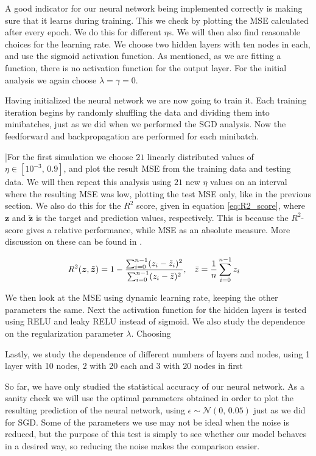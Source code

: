 \documentclass[12pt]{extarticle}
\begin{document}
A good indicator for our neural network being implemented correctly is making sure that it learns during training. This we check by plotting the MSE calculated after every epoch. We do this for different $\eta$s. We will then also find reasonable choices for the learning rate. We choose two hidden layers with ten nodes in each, and use the sigmoid activation function. As mentioned, as we are fitting a function, there is no activation function for the output layer. For the initial analysis we again choose $\lambda=\gamma=0$.

Having initialized the neural network we are now going to train it. Each training iteration begins by randomly shuffling the data and dividing them into minibatches, just as we did when we performed the SGD analysis. Now the feedforward and backpropagation are performed for each minibatch.

|For the first simulation we choose $21$ linearly distributed values of $\eta\in[10^{-3},\,0.9]$, and plot the result MSE from the training data and testing data. We will then repeat this analysis using $21$ new $\eta$ values on an interval where the resulting MSE was low, plotting the test MSE only, like in the previous section. We also do this for the $R^2$ score, given in equation \eqref{eq:R2_score}, where $\boldsymbol{z}$ and $\boldsymbol{\tilde{z}}$ is the target and prediction values, respectively. This is because the $R^2$-score gives a relative performance, while MSE as an absolute measure. More discussion on these can be found in \cite{project1}.

\begin{align} \label{eq:R2_score}
	R^2(\boldsymbol{z}, \boldsymbol{\tilde{z}}) & = 1 - \frac{\sum_{i=0}^{n-1}(z_i - \tilde{z}_i)^2}{\sum_{i=0}^{n-1}(z_i - \bar{z})^2}, \hspace{3mm} \bar{z} = \frac{1}{n}\sum_{i=0}^{n-1}z_i
\end{align}


We then look at the MSE using dynamic learning rate, keeping the other parameters the same. Next the activation function for the hidden layers is tested using RELU and leaky RELU instead of sigmoid. We also study the dependence on the regularization parameter $\lambda$. Choosing

Lastly, we study the dependence of different numbers of layers and nodes, using 1 layer with 10 nodes, 2 with 20 each and 3 with 20 nodes in first 


So far, we have only studied the statistical accuracy of our neural network. As a sanity check we will use the optimal parameters obtained in order to plot the resulting prediction of the neural network, using $\epsilon\sim\mathcal{N}(0,\,0.05)$ just as we did for SGD. Some of the parameters we use may not be ideal when the noise is reduced, but the purpose of this test is simply to see whether our model behaves in a desired way, so reducing the noise makes the comparison easier.
\end{document}
